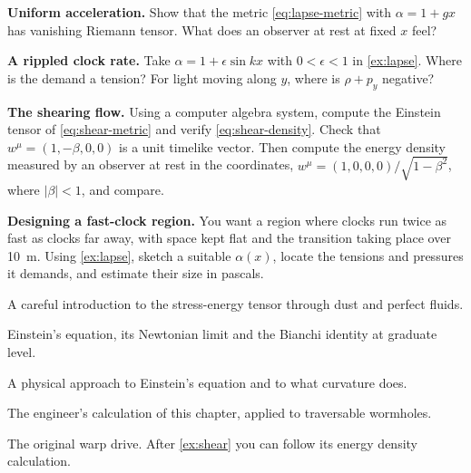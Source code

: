 \begin{problems}
\item {}\label{prob:rindler} \textbf{Uniform acceleration.} Show that the
  metric \cref{eq:lapse-metric} with $\alpha = 1 + gx$ has vanishing Riemann
  tensor. What does an observer at rest at fixed $x$ feel?
\item {} \textbf{A rippled clock rate.} Take $\alpha = 1 + \epsilon\sin kx$
  with $0 < \epsilon < 1$ in \cref{ex:lapse}. Where is the demand a tension? For
  light moving along $y$, where is $\rho + p_{y}$ negative?
\item {}\label{prob:shear-check} \textbf{The shearing flow.} Using a computer
  algebra system, compute the Einstein tensor of \cref{eq:shear-metric} and
  verify \cref{eq:shear-density}. Check that $w^{\mu} = (1,-\beta,0,0)$ is a unit
  timelike vector. Then compute the energy density measured by an observer at
  rest in the coordinates, $w^{\mu} = (1,0,0,0)/\sqrt{1-\beta^{2}}$, where
  $|\beta| < 1$, and compare.
\item {} \textbf{Designing a fast-clock region.} You want a region where
  clocks run twice as fast as clocks far away, with space kept flat and the
  transition taking place over \SI{10}{\metre}. Using \cref{ex:lapse}, sketch a
  suitable $\alpha(x)$, locate the tensions and pressures it demands, and estimate
  their size in pascals.
\end{problems}

\begin{furtherreading}
\item[\textcite{Schutz2009}] A careful introduction to the stress-energy tensor
  through dust and perfect fluids.
\item[\textcite{Carroll2004}] Einstein's equation, its Newtonian limit and the
  Bianchi identity at graduate level.
\item[\textcite{Hartle2003}] A physical approach to Einstein's equation and to
  what curvature does.
\item[\textcite{Morris1988a}] The engineer's calculation of this chapter,
  applied to traversable wormholes.
\item[\textcite{Alcubierre1994}] The original warp drive. After
  \cref{ex:shear} you can follow its energy density calculation.
\end{furtherreading}
